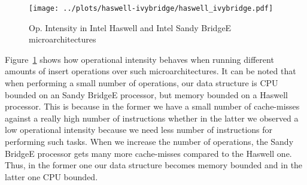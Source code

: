 \begin{figure}\centering
  	\texttt{[image: ../plots/haswell-ivybridge/haswell\_ivybridge.pdf]}
	\caption{Op. Intensity in Intel Haswell and Intel Sandy BridgeE microarchitectures}
	\label{fig:haswell_ivybridge}
\end{figure}

Figure~\ref{fig:haswell_ivybridge} shows how operational intensity behaves when running different amounts of insert operations over such microarchitectures. It can be noted that when performing a small number of operations, our data structure is CPU bounded on an Sandy BridgeE processor, but memory bounded on a Haswell processor. This is because in the former we have a small number of cache-misses against a really high number of instructions whether in the latter we observed a low operational intensity because we need less number of instructions for performing such tasks. When we increase the number of operations, the Sandy BridgeE processor gets many more cache-misses compared to the Haswell one. Thus, in the former one our data structure becomes memory bounded and in the latter one CPU bounded.
